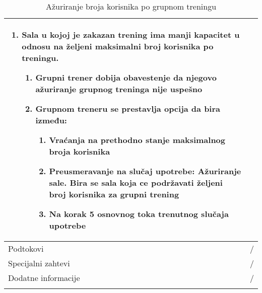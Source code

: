\documentclass[../grupniTreninzi.tex]{subfiles}
\begin{document}
\begin{longtable}{| p{} | p{} |}
\begin{enumerate}
        \item Sala u kojoj je zakazan trening ima manji kapacitet u odnosu na željeni maksimalni broj korisnika po treningu. 
            \begin{enumerate}
                \item Grupni trener dobija obavestenje da njegovo ažuriranje grupnog  treninga nije uspešno
                \item Grupnom treneru se prestavlja opcija da bira između:
                    \begin{enumerate}
                        \item Vraćanja na prethodno stanje maksimalnog broja korisnika
                        \item Preusmeravanje na slučaj upotrebe: Ažuriranje sale. Bira se sala koja ce podržavati željeni broj korisnika za grupni trening 
                        \item Na korak 5 osnovnog toka trenutnog slučaja upotrebe
                    \end{enumerate}
            \end{enumerate}
    \end{enumerate}\\
\hline
    Podtokovi & /\\
\hline
    Specijalni zahtevi & /\\
\hline
    Dodatne informacije & /\\
\hline
\caption{Ažuriranje broja korisnika po grupnom treningu} %
\end{longtable}
\end{document}
